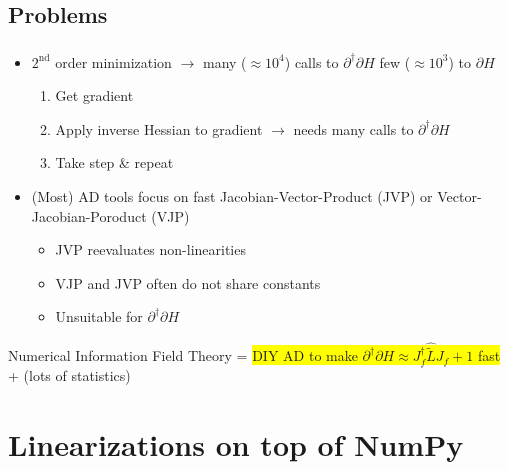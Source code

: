 \documentclass[aspectratio=169,xcolor=dvipsnames]{beamer}
\begin{document}
\subsection{Problems}  %
\begin{frame}
	\frametitle{\insertsection}
	\framesubtitle{\insertsubsection}

	\begin{itemize}
		\item $2^\text{nd}$ order minimization $\rightarrow$ many ($\approx10^4$) calls to $\partial^\dagger \partial H$ few ($\approx10^3$) to $\partial H$
		\begin{enumerate}
			\item Get gradient
			\item Apply inverse Hessian to gradient $\rightarrow$ needs many calls to $\partial^\dagger \partial H$
			\item Take step \& repeat
		\end{enumerate}
		\pause
		\item (Most) AD tools focus on fast Jacobian-Vector-Product (JVP) or Vector-Jacobian-Poroduct (VJP)
		\begin{itemize}
			\item JVP reevaluates non-linearities
			\item VJP and JVP often do not share constants
			\item Unsuitable for $\partial^\dagger \partial H$
		\end{itemize}
	\end{itemize}

	\pause
	\begin{center}
		Numerical Information Field Theory = \colorbox{yellow}{DIY AD to make $\partial^\dagger \partial H  \approx J_{f}^\dagger \widehat{\tilde{L}} J_{f} + 1$ fast}
		\\ + (lots of statistics)
	\end{center}

\end{frame}

\section{Linearizations on top of NumPy}  %
\end{document}
